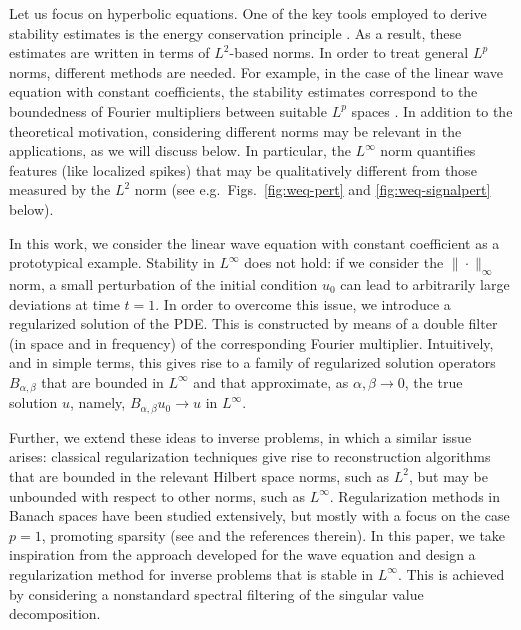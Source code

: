 \documentclass{article}
\theoremstyle{definition}
\begin{document}
Let us focus on hyperbolic equations. One of the key tools employed to derive stability  estimates is the energy conservation principle \cite{dautray-lions-5,evans2022partial}. As a result, these estimates are written in terms of $L^2$-based norms. 
In order to treat general $L^p$ norms, different methods are needed. For example, in the case of the linear wave equation with constant coefficients, the stability estimates correspond to the boundedness of Fourier multipliers between suitable $L^p$ spaces \cite{PERAL1980114,sogge1993p}.   In addition to the theoretical motivation, considering different norms may be relevant in the applications, as we will discuss below. In particular, the $L^\infty$ norm quantifies features (like localized spikes) that may be qualitatively different from those measured by the $L^2$ norm (see e.g.\  Figs.~\ref{fig:weq-pert} and \ref{fig:weq-signalpert} below).

In this work, we consider the linear wave equation with constant coefficient as a prototypical example. Stability in $L^\infty$ does not hold: if we consider the $\|\cdot\|_\infty$ norm, a small perturbation of the initial condition $u_0$ can lead to arbitrarily large deviations at time $t=1$. In order to overcome this issue, we introduce a regularized solution of the PDE. This is constructed by means of a double filter (in space and in frequency) of the corresponding Fourier multiplier. Intuitively, and in simple terms, this gives rise to a family of regularized solution operators $B_{\alpha,\beta}$  that are bounded in $L^\infty$ and that approximate, as $\alpha,\beta\to 0$, the true solution $u$, namely, $B_{\alpha,\beta} u_0 \to u$ in $L^\infty$.

Further, we extend these ideas to inverse problems, in which a similar issue arises:
 classical regularization techniques give rise to reconstruction algorithms that are bounded in the relevant Hilbert space norms, such as $L^2$, but may be unbounded with respect to other norms, such as $L^\infty$. Regularization methods in Banach spaces have been studied extensively, but mostly with a focus on the case $p=1$, promoting sparsity (see \cite{SchusterKaltenbacherHofmannKazimierski+2012} and the references therein). In this paper, we take inspiration from the approach developed for the wave equation and design a regularization method for inverse problems that is stable in $L^\infty$. This is achieved by considering a nonstandard spectral filtering of the singular value decomposition.
\end{document}
